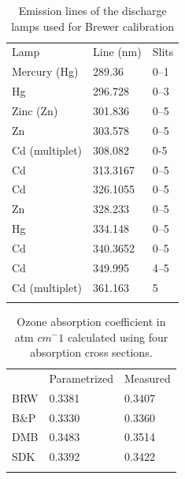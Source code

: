 \documentclass[acp]{copernicus} %
\begin{document}









\begin{table}[t]
\caption{Emission lines of the discharge lamps used for Brewer calibration}
\begin{tabular}{lll}
\tophline
Lamp           & Line (nm) & Slits \\
\middlehline
Mercury (Hg)   & 289.36    & 0–1   \\
Hg             & 296.728   & 0–3   \\
Zinc (Zn)      & 301.836   & 0–5   \\
Zn             & 303.578   & 0–5   \\
Cd (multiplet) & 308.082   & 0-5   \\
Cd             & 313.3167  & 0–5   \\
Cd             & 326.1055  & 0–5   \\
Zn             & 328.233   & 0–5   \\
Hg             & 334.148   & 0–5   \\
Cd             & 340.3652  & 0–5   \\
Cd             & 349.995   & 4–5   \\
Cd (multiplet) & 361.163   & 5     \\
\bottomhline
\end{tabular}
\belowtable{} %
\label{tab:dsp_lines}
\end{table}



\begin{table}[t]
\caption{Ozone absorption coefficient in atm $cm^-1$ calculated using four absorption cross sections.}
\begin{tabular}{lll}
\tophline
     & Parametrized & Measured \\
\middlehline
BRW  & 0.3381       & 0.3407   \\
B\&P & 0.3330       & 0.3360    \\
DMB  & 0.3483       & 0.3514   \\
SDK  & 0.3392       & 0.3422    \\
\bottomhline
\end{tabular}
\belowtable{} %
\label{tab:slit_param}
\end{table}
\end{document}
